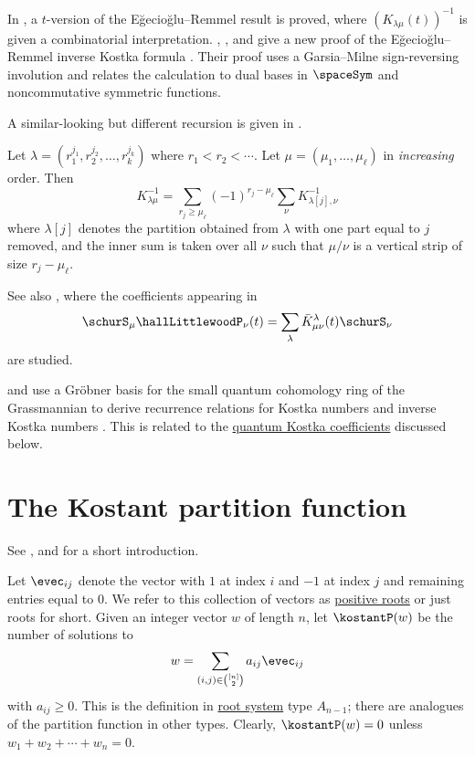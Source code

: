 In \cite{Carbonara1998}, a $t$-version of the Eğecioğlu--Remmel result is proved,
where $(K_{\lambda\mu}(t))^{-1}$ is given a combinatorial interpretation.
, , and  give a
new proof of the Eğecioğlu--Remmel inverse Kostka formula
\cite{AllenCelanoMason2025x}.  Their proof uses a Garsia--Milne
sign-reversing involution and relates the calculation to dual bases in
$\spaceSym$ and noncommutative symmetric functions.


A similar-looking but different recursion is given in \cite[Thm.~3]{Duan2003}.

\begin{theorem}[H. Duan, 2003]
Let $\lambda = (r_1^{j_1}, r_2^{j_2},\dotsc,r_k^{j_k})$ where $r_1 \lt r_2 \lt \dotsb$.
Let $\mu = (\mu_1,\dotsc,\mu_\ell)$ in \emph{increasing} order.
Then
\[
K^{-1}_{\lambda\mu} = \sum_{r_j \geq \mu_\ell} (-1)^{r_j-\mu_\ell}
\sum_{\nu} K^{-1}_{\lambda[j], \nu}
\]
where $\lambda[j]$ denotes the partition obtained from $\lambda$ with one part equal to $j$ removed,
and the inner sum is taken over all $\nu$ such that $\mu/\nu$ is a vertical strip of size $r_j-\mu_\ell$.
\end{theorem}


See also \cite{WheelerZinnJustin2018}, where the coefficients appearing in
\[
\schurS_\mu \hallLittlewoodP_\nu(t) = \sum_\lambda \bar{K}^\lambda_{\mu\nu}(t) \schurS_{\nu}
\]
are studied.




 and  use a
Gr{\"o}bner basis for the small quantum cohomology ring of the Grassmannian to
derive recurrence relations for Kostka numbers and inverse Kostka numbers
\cite{PetrovicRadovanovic2016}.  This is related to the
\hyperref[quantumKostka]{quantum Kostka coefficients} discussed below.



\section[kostantPartitionFunction]{The Kostant partition function}

See , 
and  \cite{HarrisInskoOmar2018} for a short introduction.

Let $\evec_{ij}$ denote the vector with $1$ at index $i$
and $-1$ at index $j$ and remaining entries equal to $0$.
We refer to this collection of vectors as \hyperref[rootSystem]{positive roots}
or just roots for short.
Given an integer vector $w$ of length $n$,
let \label{kostantPartitionFunctionDefinition}
$\kostantP(w)$ be the number of solutions to
\[
w = \sum_{(i,j) \in \binom{[n]}{2}} a_{ij} \evec_{ij}
\]
with $a_{ij}\geq 0$.
This is the definition in \hyperref[rootSystem]{root system} type $A_{n-1}$;
there are analogues of the partition function in other types.
Clearly, $\kostantP(w)=0$ unless $w_1+w_2+\dotsb+w_n=0$.

